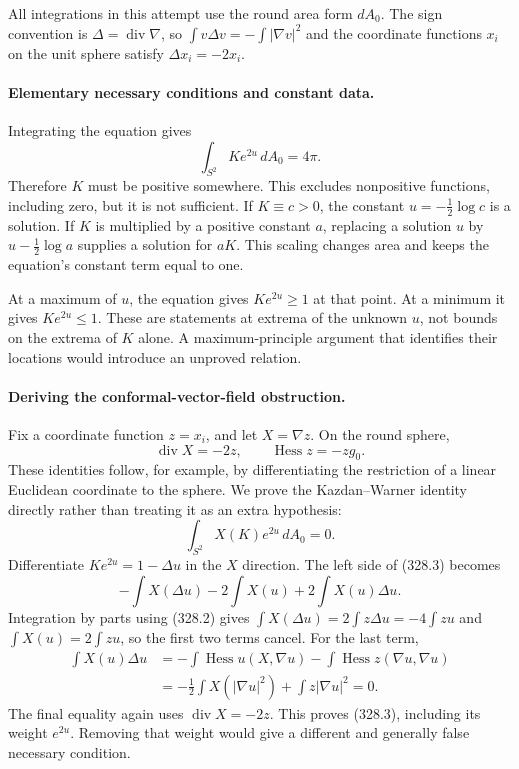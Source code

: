 \documentclass[11pt]{article}
\begin{document}
All integrations in this attempt use the round area form $dA_0$.
The sign convention is $\Delta=\operatorname{div}\nabla$, so
$\int v\Delta v=-\int|\nabla v|^2$ and the coordinate functions
$x_i$ on the unit sphere satisfy $\Delta x_i=-2x_i$.

\paragraph{Elementary necessary conditions and constant data.}
Integrating the equation gives
\[
 \int_{S^2}K e^{2u}\,dA_0=4\pi.
 \tag{328.1}
\]
Therefore $K$ must be positive somewhere. This excludes nonpositive
functions, including zero, but it is not sufficient. If $K\equiv c>0$,
the constant $u=-\tfrac12\log c$ is a solution. If $K$ is multiplied
by a positive constant $a$, replacing a solution $u$ by
$u-\tfrac12\log a$ supplies a solution for $aK$. This scaling
changes area and keeps the equation's constant term equal to one.

At a maximum of $u$, the equation gives $K e^{2u}\geq1$ at that
point. At a minimum it gives $K e^{2u}\leq1$. These are statements
at extrema of the unknown $u$, not bounds on the extrema of $K$
alone. A maximum-principle argument that identifies their locations
would introduce an unproved relation.

\paragraph{Deriving the conformal-vector-field obstruction.}
Fix a coordinate function $z=x_i$, and let $X=\nabla z$. On the
round sphere,
\[
 \operatorname{div}X=-2z,\qquad
 \operatorname{Hess}z=-z g_0.
 \tag{328.2}
\]
These identities follow, for example, by differentiating the
restriction of a linear Euclidean coordinate to the sphere. We prove
the Kazdan--Warner identity directly rather than treating it as an
extra hypothesis:
\[
 \int_{S^2}X(K)e^{2u}\,dA_0=0.
 \tag{328.3}
\]
Differentiate $Ke^{2u}=1-\Delta u$ in the $X$ direction. The left
side of (328.3) becomes
\[
 -\int X(\Delta u)-2\int X(u)+2\int X(u)\Delta u.
 \tag{328.4}
\]
Integration by parts using (328.2) gives
$\int X(\Delta u)=2\int z\Delta u=-4\int zu$ and
$\int X(u)=2\int zu$, so the first two terms cancel.
For the last term,
\[
 \begin{split}
 \int X(u)\Delta u
 &=-\int\operatorname{Hess}u(X,\nabla u)
          -\int\operatorname{Hess}z(\nabla u,\nabla u)\\
 &=-\tfrac12\int X(|\nabla u|^2)+\int z|\nabla u|^2=0.
 \end{split}
\]
The final equality again uses $\operatorname{div}X=-2z$. This proves
(328.3), including its weight $e^{2u}$. Removing that weight would
give a different and generally false necessary condition.
\end{document}
